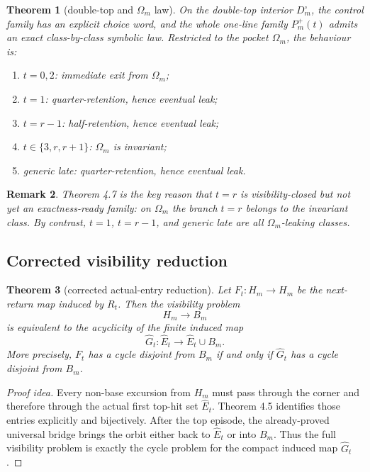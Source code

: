 \documentclass[11pt]{article}
\newtheorem{theorem}{Theorem}[section]
\newtheorem{remark}[theorem]{Remark}
\newcommand{\1}{\mathbf 1}
\newcommand{\Hm}{H_m}
\newcommand{\Bm}{B_m}
\newcommand{\Em}{\widehat E_t}
\newcommand{\Gt}{\widehat G_t}
\newcommand{\Om}{\Omega_m}
\newcommand{\Dt}{D_m^\circ}
\begin{document}
\begin{theorem}[double-top and \(\Omega_m\) law]
On the double-top interior \(\Dt\), the control family has an explicit choice word, and the whole one-line family \(P_m^+(t)\) admits an exact class-by-class symbolic law.
Restricted to the pocket \(\Om\), the behaviour is:
\begin{enumerate}[label=\textup{(\arabic*)},leftmargin=2.8em]
\item \(t=0,2\): immediate exit from \(\Om\);
\item \(t=1\): quarter-retention, hence eventual leak;
\item \(t=r-1\): half-retention, hence eventual leak;
\item \(t\in\{3,r,r+1\}\): \(\Om\) is invariant;
\item generic late: quarter-retention, hence eventual leak.
\end{enumerate}
\end{theorem}

\begin{remark}
Theorem 4.7 is the key reason that \(t=r\) is visibility-closed but not yet an exactness-ready family: on \(\Om\) the branch \(t=r\) belongs to the invariant class.
By contrast, \(t=1\), \(t=r-1\), and generic late are all \(\Om\)-leaking classes.
\end{remark}

\subsection{Corrected visibility reduction}

\begin{theorem}[corrected actual-entry reduction]
Let \(F_t:\Hm\to \Hm\) be the next-return map induced by \(R_t\).
Then the visibility problem
\[
\Hm \to \Bm
\]
is equivalent to the acyclicity of the finite induced map
\[
\Gt:\Em\to \Em\cup \Bm.
\]
More precisely, \(F_t\) has a cycle disjoint from \(\Bm\) if and only if \(\Gt\) has a cycle disjoint from \(\Bm\).
\end{theorem}

\begin{proof}[Proof idea]
Every non-base excursion from \(\Hm\) must pass through the corner and therefore through the actual first top-hit set \(\Em\).
Theorem 4.5 identifies those entries explicitly and bijectively.
After the top episode, the already-proved universal bridge brings the orbit either back to \(\Em\) or into \(\Bm\).
Thus the full visibility problem is exactly the cycle problem for the compact induced map \(\Gt\).
\end{proof}
\end{document}
